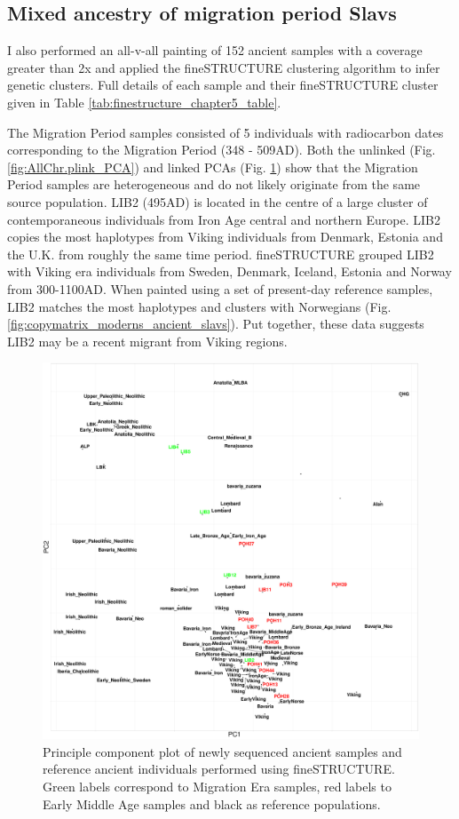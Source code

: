 \subsection{Mixed ancestry of migration period Slavs}

I also performed an all-v-all painting of 152 ancient samples with a coverage greater than 2x and applied the fineSTRUCTURE clustering algorithm to infer genetic clusters. Full details of each sample and their fineSTRUCTURE cluster given in Table \ref{tab:finestructure_chapter5_table}.

The Migration Period samples consisted of 5 individuals with radiocarbon dates corresponding to the Migration Period (348 - 509AD). Both the unlinked (Fig. \ref{fig:AllChr.plink_PCA}) and linked PCAs (Fig. \ref{fig:fs_PCA}) show that the Migration Period samples are heterogeneous and do not likely originate from the same source population. LIB2 (495AD) is located in the centre of a large cluster of contemporaneous individuals from Iron Age central and northern Europe. LIB2 copies the most haplotypes from Viking individuals from Denmark, Estonia and the U.K. from roughly the same time period. fineSTRUCTURE grouped LIB2 with Viking era individuals from Sweden, Denmark, Iceland, Estonia and Norway from 300-1100AD. When painted using a set of present-day reference samples, LIB2 matches the most haplotypes and clusters with Norwegians (Fig. \ref{fig:copymatrix_moderns_ancient_slavs}). Put together, these data suggests LIB2 may be a recent migrant from Viking regions. 

\begin{figure}[htp]
    \centering
    \includegraphics[width=1.0\textwidth]{../images/chapter5/fs_PCA.pdf}
    \caption{Principle component plot of newly sequenced ancient samples and reference ancient individuals performed using fineSTRUCTURE. Green labels correspond to Migration Era samples, red labels to Early Middle Age samples and black as reference populations.}
    \label{fig:fs_PCA}
\end{figure}

